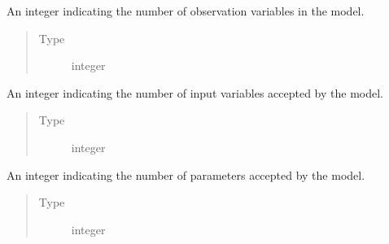 \documentclass[letterpaper,10pt,english,openany,oneside]{sphinxmanual}
\begin{document}
\begin{fulllineitems}
\begin{fulllineitems}
\begin{quote}
\begin{description}
\end{description}\end{quote}

\end{fulllineitems}


\begin{fulllineitems}
\label{\detokenize{nloed:nloed.model.Model.num_observ}}
An integer indicating the number of observation variables in the model.
\begin{quote}\begin{description}
\item[{Type}] \leavevmode
integer

\end{description}\end{quote}

\end{fulllineitems}


\begin{fulllineitems}
\label{\detokenize{nloed:nloed.model.Model.num_input}}
An integer indicating the number of input variables accepted by the model.
\begin{quote}\begin{description}
\item[{Type}] \leavevmode
integer

\end{description}\end{quote}

\end{fulllineitems}


\begin{fulllineitems}
\label{\detokenize{nloed:nloed.model.Model.num_param}}
An integer indicating the number of parameters accepted by the model.
\begin{quote}\begin{description}
\item[{Type}] \leavevmode
integer


\end{description}
\end{quote}
\end{fulllineitems}
\end{fulllineitems}
\end{document}
